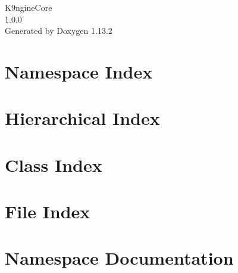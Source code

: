 \documentclass[twoside]{book}
\newcommand{\+}{\discretionary{\mbox{\scriptsize$\hookleftarrow$}}{}{}}
\newcommand{\clearemptydoublepage}{%
    \newpage{\pagestyle{empty}\cleardoublepage}%
  }
\begin{document}
  \raggedbottom
    \hypersetup{pageanchor=false,
                bookmarksnumbered=true,
                pdfencoding=unicode
               }
  \begin{titlepage}
  \vspace*{7cm}
  \begin{center}%
  {\Large K9ngine\+Core}\\
  [1ex]\large 1.\+0.\+0 \\
  \vspace*{1cm}
  {\large Generated by Doxygen 1.13.2}\\
  \end{center}
  \end{titlepage}
  \clearemptydoublepage
  \tableofcontents
  \clearemptydoublepage
  \hypersetup{pageanchor=true}
\chapter{Namespace Index}

\chapter{Hierarchical Index}

\chapter{Class Index}

\chapter{File Index}

\chapter{Namespace Documentation}








\end{document}
